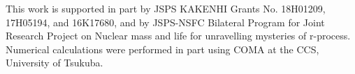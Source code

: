 \documentclass[%
superscriptaddress,
showpacs,
nofootinbib,
amsmath,amssymb,
aps,
prc,
twocolumn,
floatfix ]%
{revtex4-1}
\begin{document}


\begin{acknowledgments}
This work is supported in part by JSPS KAKENHI Grants No. 18H01209, 17H05194, and 16K17680,
and
by JSPS-NSFC Bilateral Program for Joint Research Project
on Nuclear mass and life for unravelling mysteries of r-process.
Numerical calculations were performed in part using COMA at the CCS,
University of Tsukuba.
\end{acknowledgments}



\end{document}

